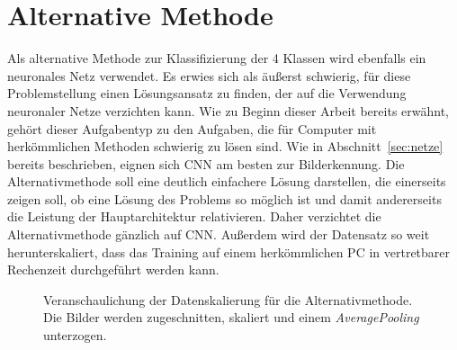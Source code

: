 {\let\clearpage\relax \chapter{Alternative Methode}\label{sec:alter}}

Als alternative Methode zur Klassifizierung der 4 Klassen wird ebenfalls ein
neuronales Netz verwendet. Es erwies sich als äußerst schwierig, für diese
Problemstellung einen Lösungsansatz zu finden, der auf die Verwendung
neuronaler Netze verzichten kann. Wie zu Beginn dieser Arbeit bereits erwähnt,
gehört dieser Aufgabentyp zu den Aufgaben, die für Computer mit herkömmlichen
Methoden schwierig zu lösen sind.
Wie in Abschnitt~\ref{sec:netze} bereits beschrieben, eignen sich CNN am besten
zur Bilderkennung. Die Alternativmethode soll eine deutlich einfachere Lösung
darstellen, die einerseits zeigen soll, ob eine Lösung des Problems so möglich
ist und damit andererseits die Leistung der Hauptarchitektur
relativieren. Daher verzichtet die Alternativmethode gänzlich auf CNN.
Außerdem wird der Datensatz so weit herunterskaliert, dass das Training auf
einem herkömmlichen PC in vertretbarer Rechenzeit durchgeführt werden kann.
%
\begin{figure}[h!]
  \renewcommand{\baselinestretch}{1.0}
  \hspace{5pt}
  \caption{Veranschaulichung der Datenskalierung für die Alternativmethode. Die Bilder werden zugeschnitten, skaliert und einem \textit{AveragePooling} unterzogen.}
  \renewcommand{\baselinestretch}{1.5}
  \label{fig:alter}
\end{figure}
